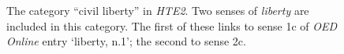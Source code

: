 
\begin{figure}[htb]
    \centering
	\caption[]{\label{fig:Stolk_thes-content:HTE2-cat-civilliberty} The category ``civil liberty'' in \textit{HTE2}. Two senses of \textit{liberty} are included in this category. The first of these links to sense 1c of \textit{OED Online} entry `liberty, n.1'; the second to sense 2c.}
\end{figure} 

